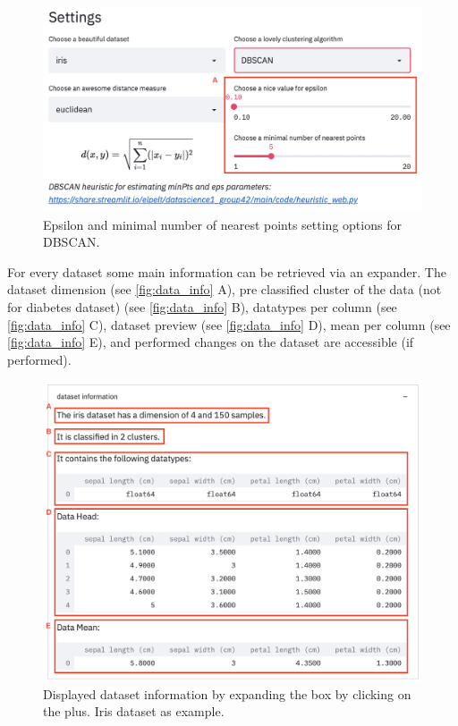 \begin{figure}[H]
	\centering
	\includegraphics[width=\linewidth]{report/modules/web_frontend/DBSCAN_settings.png}
	\caption{Epsilon and minimal number of nearest points setting options for DBSCAN.}\label{fig:dbscan_para}
\end{figure}

For every dataset some main information can be retrieved via an expander. The dataset dimension (see \autoref{fig:data_info} A), pre classified cluster of the data (not for diabetes dataset) (see \autoref{fig:data_info} B), datatypes per column (see \autoref{fig:data_info} C), dataset preview (see \autoref{fig:data_info} D), mean per column (see \autoref{fig:data_info} E), and performed changes on the dataset are accessible (if performed).

\begin{figure}[H]
	\centering
	\includegraphics[width=\linewidth]{report/modules/web_frontend/dataset_inofs.png}
	\caption{Displayed dataset information by expanding the box by clicking on the plus. Iris dataset as example.}\label{fig:data_info}
\end{figure}

